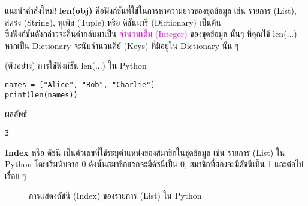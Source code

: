 \documentclass[12pt,a4paper]{article}
\newcommand{\textlight}[1]{{\thailightfont #1}}
\begin{document}
\begin{noticebox}{แนะนำคำสั่งใหม่!}
\textlight{\textbf{len(obj)} คือฟังก์ชันที่ใช้ในการหาความยาวของชุดข้อมูล เช่น รายการ (List), สตริง (String), ทูเพิล (Tuple) หรือ ดิชันนารี (Dictionary) เป็นต้น \\[0.2cm] ซึ่งฟังก์ชันดังกล่าวจะคืนค่ากลับมาเป็น \textcolor{magenta}{จำนวนเต็ม (Integer)} ของชุดข้อมูล นั้นๆ ที่คุณใช้ len(...) \\[0.2cm] หากเป็น Dictionary จะนับจำนวนคีย์ (Keys) ที่มีอยู่ใน Dictionary นั้น ๆ}
\end{noticebox}

\begin{codebox}{(ตัวอย่าง) การใช้ฟังก์ชัน len(...) ใน Python}
\begin{lstlisting}[style=python]
names = ["Alice", "Bob", "Charlie"]
print(len(names))
\end{lstlisting}
\end{codebox}

\begin{resultbox}{ผลลัพธ์}
\begin{verbatim}
3
\end{verbatim}
\end{resultbox}

\vspace{0.5cm}

\textlight{\textbf{Index} หรือ ดัชนี เป็นตัวเลขที่ใช้ระบุตำแหน่งของสมาชิกในชุดข้อมูล เช่น รายการ (List) ใน Python โดยเริ่มนับจาก 0 ดังนั้นสมาชิกแรกจะมีดัชนีเป็น 0, สมาชิกที่สองจะมีดัชนีเป็น 1 และต่อไปเรื่อย ๆ}

\begin{figure}[H]
\centering
{}
\caption{การแสดงดัชนี (Index) ของรายการ (List) ใน Python}
\end{figure}
\end{document}
